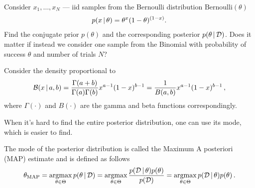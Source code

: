 \begin{exercise}
    Consider $x_1,\ldots,x_N$ --- iid samples from the Bernoulli distribution $\text{Bernoulli}(\theta)$
    \begin{align}
        p(x\,|\, \theta) = \theta^x(1-\theta)^{(1-x)}.
    \end{align}
    Find the conjugate prior $p(\theta)$ and the corresponding posterior $p(\theta\,|\, \mathcal{D})$. Does it matter if instead we consider one sample from the Binomial with probability of success $\theta$ and number of trials $N$?
\end{exercise}

\begin{mybox}
\begin{definition}\label{def:beta_density}
    Consider the density proportional to 
    \begin{align}
        \mathcal{B}(x\,|\, a,b) = \frac{\Gamma(a+b)}{\Gamma(a)\Gamma(b)}x^{a-1}(1-x)^{b-1} = \frac{1}{B(a,b)}x^{a-1}(1-x)^{b-1}\,,
    \end{align}
    where $\Gamma(\cdot)$ and $B(\cdot)$ are the gamma and beta functions correspondingly.
\end{definition}
\end{mybox}

When it's hard to find the entire posterior distribution, one can use its mode, which is easier to find.
\begin{mybox}
\begin{definition}\label{def:map}
    The mode of the posterior distribution is called the Maximum A posteriori (MAP) estimate and is defined as follows
    \begin{align}
        \theta_{\text{MAP}} = \operatorname*{argmax}_{\theta \in \Theta} p(\theta \,|\, \mathcal{D}) = \operatorname*{argmax}_{\theta \in \Theta} \frac{p(\mathcal{D} \,|\, \theta)p(\theta)}{p(\mathcal{D})} = \operatorname*{argmax}_{\theta \in \Theta} p(\mathcal{D} \,|\, \theta)p(\theta)\,.
    \end{align}
\end{definition}
\end{mybox}

